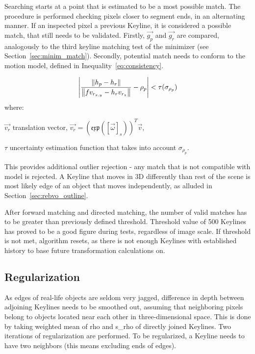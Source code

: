 Searching starts at a point that is estimated to be a most possible match. The procedure is performed checking pixels closer to segment ends, in an alternating manner. If an inspected pixel a previous Keyline, it is considered a possible match, that still needs to be validated. Firstly, $\vec{g_p}$ and $\vec{g_r}$ are compared, analogously to the third keyline matching test of the minimizer (see Section~\ref{sec:minim_match}). Secondly, potential match needs to conform to the motion model, defined in Inequality~\ref{eq:consistency}.

\begin{equation}
\abs* {\frac{\norm*{h_p - h_r}}{\norm*{fv_{r_{x,y}}-h_{r}v_{r_z}} }-\rho_{p}} < \tau(\sigma_{\rho_{p}})
\label{eq:consistency}
\end{equation}
where:
\begin{eqwhere}[2cm]
	\item[$\vec{v_r}$] translation vector, $\vec{v_r} = \left( \mathfrak{exp} \left ( \left[ \vec{\omega} \right ]_{s} \right ) \right) ^T \vec{v}$,
	\item[$\tau$] uncertainty estimation function that takes into account $\sigma_{\rho_{p}}$.
\end{eqwhere}

This provides additional outlier rejection - any match that is not compatible with model is rejected. A Keyline that moves in 3D differently than rest of the scene is most likely edge of an object that moves independently, as alluded in Section~\ref{sec:rebvo_outline}.

After forward matching and directed matching, the number of valid matches has to be greater than previously defined threshold. Threshold value of 500 Keylines has proved to be a good figure during tests, regardless of image scale.  If threshold is not met, algorithm resets, as there is not enough Keylines with established history to base future transformation calculations on.

\subsection{Regularization}

%
%

As edges of real-life objects are seldom very jagged, difference in depth between adjoining Keylines needs to be smoothed out, assuming that neighboring pixels belong to objects located near each other in three-dimensional space. This is done by taking weighted mean of rho and s\_rho of directly joined Keylines. Two iterations of regularization are performed. To be regularized, a Keyline needs to have two neighbors (this means excluding ends of edges).

